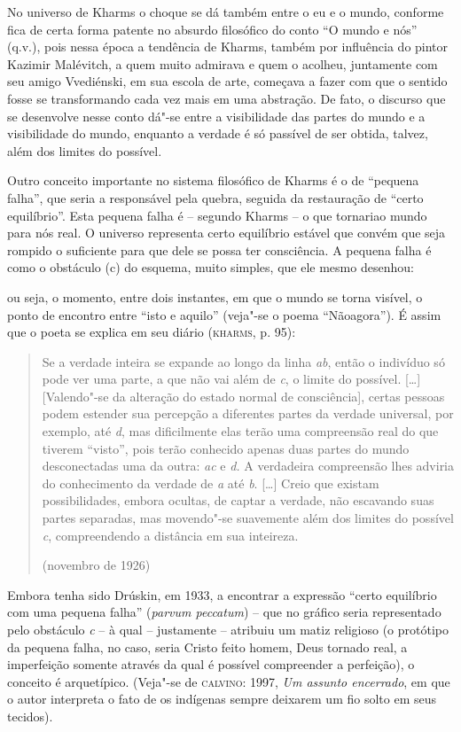 No universo de Kharms o choque se dá também entre o eu e o mundo,
conforme fica de certa forma patente no absurdo filosófico do conto ``O
mundo e nós'' (q.v.), pois nessa época a tendência de Kharms, também por
influência do pintor Kazimir Malévitch, a quem muito admirava e quem o
acolheu, juntamente com seu amigo Vvediénski, em sua escola de arte,
começava a fazer com que o sentido fosse se transformando cada vez mais
em uma abstração. De fato, o discurso que se desenvolve nesse conto
dá"-se entre a visibilidade das partes do mundo e a visibilidade do
mundo, enquanto a verdade é só passível de ser obtida, talvez, além dos
limites do possível.

Outro conceito importante no sistema filosófico de Kharms é o de
``pequena falha'', que seria a responsável pela quebra, seguida da
restauração de ``certo equilíbrio''. Esta pequena falha é -- segundo
Kharms -- o que tornariao mundo para nós real. O universo representa
certo equilíbrio estável que convém que seja rompido o suficiente para
que dele se possa ter consciência. A pequena falha é como o obstáculo
(c) do esquema, muito simples, que ele mesmo desenhou:

ou seja, o momento, entre dois instantes, em que o mundo se torna
visível, o ponto de encontro entre ``isto e aquilo'' (veja"-se o poema
``Nãoagora''). É assim que o poeta se explica em seu diário
(\textsc{kharms}, p. 95):

\begin{quote}
Se a verdade inteira se expande ao longo da linha \emph{ab}, então o
indivíduo só pode ver uma parte, a que não vai além de \emph{c}, o
limite do possível. {[}\ldots{}{]} {[}Valendo"-se da alteração do estado
normal de consciência{]}, certas pessoas podem estender sua percepção a
diferentes partes da verdade universal, por exemplo, até \emph{d}, mas
dificilmente elas terão uma compreensão real do que tiverem ``visto'',
pois terão conhecido apenas duas partes do mundo desconectadas uma da
outra: \emph{ac} e \emph{d.} A verdadeira compreensão lhes adviria do
conhecimento da verdade de \emph{a} até \emph{b}. {[}\ldots{}{]} Creio que
existam possibilidades, embora ocultas, de captar a verdade, não
escavando suas partes separadas, mas movendo"-se suavemente além dos
limites do possível \emph{c}, compreendendo a distância em sua
inteireza.

(novembro de 1926)
\end{quote}

Embora tenha sido Drúskin, em 1933, a encontrar a expressão ``certo
equilíbrio com uma pequena falha'' (\emph{parvum peccatum}) -- que no
gráfico seria representado pelo obstáculo \emph{c} -- à qual --
justamente -- atribuiu um matiz religioso (o protótipo da pequena falha,
no caso, seria Cristo feito homem, Deus tornado real, a imperfeição
somente através da qual é possível compreender a perfeição), o conceito
é arquetípico. (Veja"-se de \textsc{calvino}: 1997, \emph{Um assunto
encerrado}, em que o autor interpreta o fato de os indígenas sempre
deixarem um fio solto em seus tecidos).

